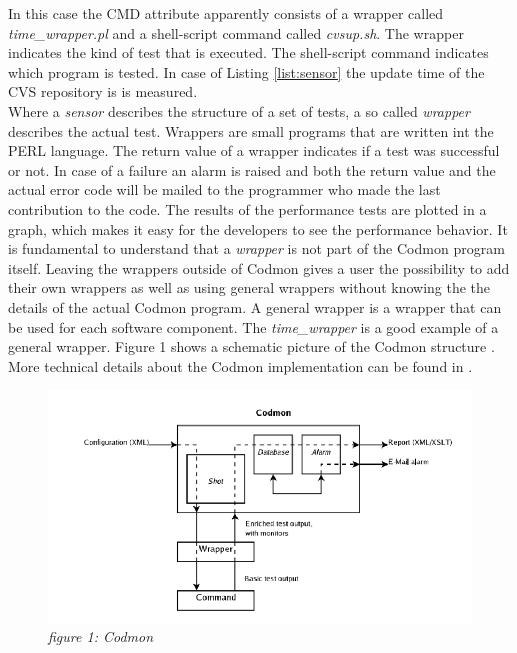 \documentclass[a4paper,10pt]{scrartcl}
\begin{document}
\noindent In this case the CMD attribute apparently consists of a wrapper called \emph{time\_wrapper.pl} and a shell-script command called \emph{cvsup.sh}. The wrapper indicates the kind of test
that is executed. The shell-script command indicates which program is tested. In case of Listing \ref{list:sensor} the update time of the CVS repository is is measured.\\


\noindent Where a \emph{sensor} describes the structure of a set of tests, a so called \emph{wrapper} describes the actual test. Wrappers are small programs that are written int the PERL
language. The return value of a wrapper indicates if a test was successful or not. In case of a failure an alarm is raised and both the return value and the actual error code will be mailed to
the programmer who made the last contribution to the code. The results of the performance tests are plotted in a graph, which makes it easy for the developers to see the performance
behavior. It is fundamental to understand that a \emph{wrapper} is not part of the Codmon program itself. Leaving the wrappers outside of Codmon gives a user the possibility to add their own 
wrappers as well as using general wrappers without knowing the the details of the actual Codmon program. A general wrapper is a wrapper that can be used for each software component. The 
\emph{time\_wrapper} is a good example of a general wrapper. Figure 1 shows a schematic picture of the Codmon structure \cite{Codmon}. More technical details about the Codmon implementation 
can be found in \cite{Codmon}.

\begin{figure}[!ht]
  \caption{\emph{figure 1: Codmon}}
  \centering
    \includegraphics[scale=0.5]{codmon}
\end{figure}
\end{document}
